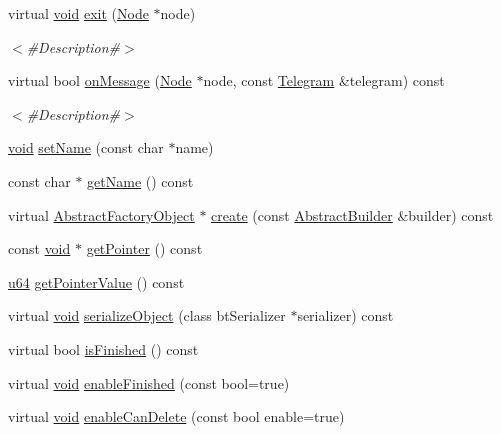 \begin{DoxyCompactItemize}
virtual \mbox{\hyperlink{_thread_8h_af1e856da2e658414cb2456cb6f7ebc66}{void}} \mbox{\hyperlink{classnjli_1_1_node_state_adbc43108aab891099b2cd9080f97a543}{exit}} (\mbox{\hyperlink{classnjli_1_1_node}{Node}} $\ast$node)
\begin{DoxyCompactList}\small\item\em $<$\#\+Description\#$>$ \end{DoxyCompactList}\item 
virtual bool \mbox{\hyperlink{classnjli_1_1_node_state_aa05ae9e51e4a9c5061dbf6815e1a6b27}{on\+Message}} (\mbox{\hyperlink{classnjli_1_1_node}{Node}} $\ast$node, const \mbox{\hyperlink{classnjli_1_1_telegram}{Telegram}} \&telegram) const
\begin{DoxyCompactList}\small\item\em $<$\#\+Description\#$>$ \end{DoxyCompactList}\item 
\mbox{\hyperlink{_thread_8h_af1e856da2e658414cb2456cb6f7ebc66}{void}} \mbox{\hyperlink{classnjli_1_1_node_state_a087eb5f8d9f51cc476f12f1d10a3cb95}{set\+Name}} (const char $\ast$name)
\item 
const char $\ast$ \mbox{\hyperlink{classnjli_1_1_node_state_ad41266885be835f3ee602311e20877a4}{get\+Name}} () const
\item 
virtual \mbox{\hyperlink{classnjli_1_1_abstract_factory_object}{Abstract\+Factory\+Object}} $\ast$ \mbox{\hyperlink{classnjli_1_1_node_state_a83a8876ae63b92804004cf3febe76573}{create}} (const \mbox{\hyperlink{classnjli_1_1_abstract_builder}{Abstract\+Builder}} \&builder) const
\item 
const \mbox{\hyperlink{_thread_8h_af1e856da2e658414cb2456cb6f7ebc66}{void}} $\ast$ \mbox{\hyperlink{classnjli_1_1_node_state_ac4ca71716ed832be357f15f8262c8448}{get\+Pointer}} () const
\item 
\mbox{\hyperlink{_util_8h_ad758b7a5c3f18ed79d2fcd23d9f16357}{u64}} \mbox{\hyperlink{classnjli_1_1_node_state_a4ffddf141a426a5a07d0ac19f1913811}{get\+Pointer\+Value}} () const
\item 
virtual \mbox{\hyperlink{_thread_8h_af1e856da2e658414cb2456cb6f7ebc66}{void}} \mbox{\hyperlink{classnjli_1_1_node_state_a4fc4bcd9d1930911474210c047372fc0}{serialize\+Object}} (class bt\+Serializer $\ast$serializer) const
\item 
virtual bool \mbox{\hyperlink{classnjli_1_1_node_state_a4c7007210237496fbe169ba114c3750d}{is\+Finished}} () const
\item 
virtual \mbox{\hyperlink{_thread_8h_af1e856da2e658414cb2456cb6f7ebc66}{void}} \mbox{\hyperlink{classnjli_1_1_node_state_aa4e66d0016cd5c43dc3a485eaf558174}{enable\+Finished}} (const bool=true)
\item 
virtual \mbox{\hyperlink{_thread_8h_af1e856da2e658414cb2456cb6f7ebc66}{void}} \mbox{\hyperlink{classnjli_1_1_node_state_a4ed007508bd8f80af668a302376b7d1a}{enable\+Can\+Delete}} (const bool enable=true)
\end{DoxyCompactItemize}
